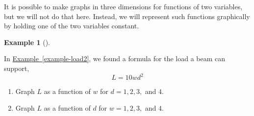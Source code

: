 \documentclass[10pt,]{book}
\theoremstyle{plain}
\theoremstyle{definition}
\theoremstyle{definition}
\theoremstyle{definition}
\newtheorem{example}[theorem]{Example}
\theoremstyle{definition}
\theoremstyle{definition}
\numberwithin{equation}{section}
\begin{document}
    It is possible to make graphs in three dimensions for functions of two variables, but we will not do that here. Instead, we will represent such functions graphically by holding one of the two variables constant.
%
\begin{example}[]\label{example-load3}

    In \hyperref[example-load2]{Example~\ref{example-load2}}, we found a formula for the load a beam can support,
    \begin{equation*}L = 10wd^2\end{equation*}
    \leavevmode%
\begin{enumerate}[label=*\alph**]
\item\hypertarget{li-586}{}Graph \(L\) as a function of \(w\) for \(d = 1, 2, 3,\) and \(4\).\item\hypertarget{li-587}{}Graph \(L\) as a function of \(d\) for \(w = 1, 2, 3,\) and \(4\).\end{enumerate}


\end{example}
\end{document}
